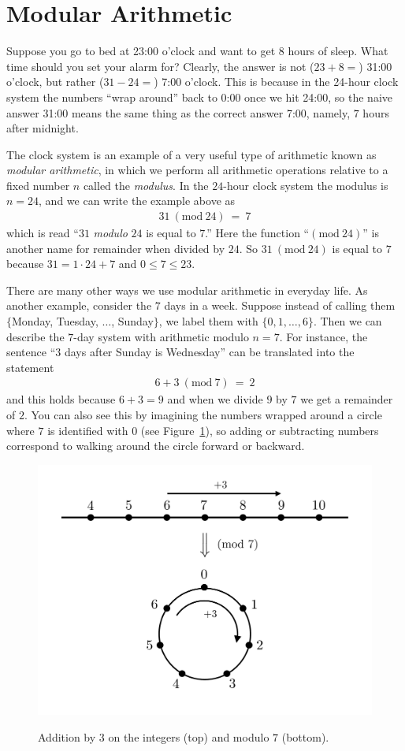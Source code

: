 \documentclass[11pt]{article}
\newcounter{thm}
\renewcommand{\pmod}[1]{~(\text{mod}~#1)}
\begin{document}
\maketitle

\section{Modular Arithmetic}

Suppose you go to bed at 23:00 o'clock and want to get $8$ hours of sleep. What time should you set your alarm for? Clearly, the answer is not ($23 + 8 = $) 31:00 o'clock, but rather ($31 - 24 = $) 7:00 o'clock. This is because in the 24-hour clock system the numbers ``wrap around'' back to 0:00 once we hit 24:00, so the naive answer 31:00 means the same thing as the correct answer 7:00, namely, $7$ hours after midnight.

The clock system is an example of a very useful type of arithmetic known as {\em modular arithmetic}, in which we perform all arithmetic operations relative to a fixed number $n$ called the {\em modulus}. In the $24$-hour clock system the modulus is $n = 24$, and we can write the example above as
\begin{align*}
    31 \pmod{24} ~=~ 7 
\end{align*}
which is read ``$31$ {\em modulo} $24$ is equal to $7$.'' Here the function ``$(\text{mod}~24)$'' is another name for remainder when divided by $24$. So $31 \pmod{24}$ is equal to $7$ because $31 = 1 \cdot 24 + 7$ and $0 \le 7 \le 23$.

There are many other ways we use modular arithmetic in everyday life. As another example, consider the $7$ days in a week. Suppose instead of calling them $\{$Monday, Tuesday, $\dots$, Sunday$\}$, we label them with $\{0,1,\dots,6\}$. Then we can describe the $7$-day system with arithmetic modulo $n = 7$. For instance, the sentence ``$3$ days after Sunday is Wednesday'' can be translated into the statement
\begin{align*}
    6 + 3 \pmod{7} ~=~ 2
\end{align*}
and this holds because $6+3 = 9$ and when we divide $9$ by $7$ we get a remainder of $2$. You can also see this by imagining the numbers wrapped around a circle where $7$ is identified with $0$ (see Figure~\ref{Fig:ModCircle}), so adding or subtracting numbers correspond to walking around the circle forward or backward.

\vspace{4pt}
\begin{figure}[h!]
  \centering
\includegraphics[width=.35\textwidth]{ModCircle}
\label{Fig:ModCircle}
\caption{Addition by $3$ on the integers (top) and modulo $7$ (bottom).}
\end{figure}
\vspace{4pt}
\end{document}
